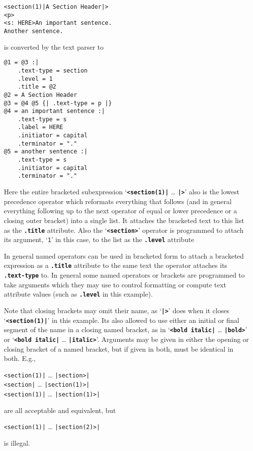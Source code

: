 \documentclass[12pt]{article}
\newcommand{\TT}[1]{{\tt \bfseries #1}}
\newenvironment{indpar}[1][0.3in]%
	{\begin{list}{}%
		     {\setlength{\itemsep}{0in}%
		      \setlength{\topsep}{0in}%
		      \setlength{\parsep}{1ex}%
		      \setlength{\labelwidth}{#1}%
		      \setlength{\leftmargin}{#1}%
		      \addtolength{\leftmargin}{\labelsep}}%
	 \item}%
	{\end{list}}
\begin{document}
\begin{indpar}\begin{verbatim}
<section(1)|A Section Header|>
<p>
<s: HERE>An important sentence.
Another sentence.
\end{verbatim}\end{indpar}

is converted by the text parser to

\begin{indpar}\begin{verbatim}
@1 = @3 :|
    .text-type = section
    .level = 1
    .title = @2
@2 = A Section Header
@3 = @4 @5 {| .text-type = p |}
@4 = an important sentence :|
    .text-type = s
    .label = HERE
    .initiator = capital 
    .terminator = "."
@5 = another sentence :|
    .text-type = s
    .initiator = capital 
    .terminator = "."
\end{verbatim}\end{indpar}

Here the entire bracketed subexpression
`\TT{<section(1)|} \ldots{} \TT{|>}'
also is the lowest precedence operator which reformats everything that
follows (and in general everything following up to the next operator of
equal or lower precedence or a closing outer bracket) into a single list.
It attaches the bracketed text to this list as the \TT{.title} attribute.
Also the `\TT{<section>}' operator is programmed to attach its argument,
`\verb|1|' in this case, to the list as the \TT{.level} attribute

In general named operators can be used in bracketed form to attach
a bracketed expression as a \TT{.title} attribute to the same text
the operator attaches its \TT{.text-type} to.  In general some
named operators or brackets are programmed to take arguments which
they may use to control formatting or compute text attribute values
(such as \TT{.level} in this example).

Note that closing brackets may omit their name, as `\TT{|>}' does
when it closes `\TT{<section(1)|}' in this example.  Its also allowed to
use either an initial or final segment of the name in a closing
named bracket, as in `\TT{<bold italic|} \ldots{} \TT{|bold>}'
or `\TT{<bold italic|} \ldots{} \TT{|italic>}'.
Arguments may be given in either the opening or closing bracket of a named
bracket, but if given in both, must be identical in both.  E.g.,
\begin{center}
\verb/<section(1)|/ \ldots{} \verb/|section>|/ \\
\verb/<section|/ \ldots{} \verb/|section(1)>|/ \\
\verb/<section(1)|/ \ldots{} \verb/|section(1)>|/ \\
\end{center}
are all acceptable and equivalent, but
\begin{center}
\verb/<section(1)|/ \ldots{} \verb/|section(2)>|/
\end{center}
is illegal.
\end{document}
